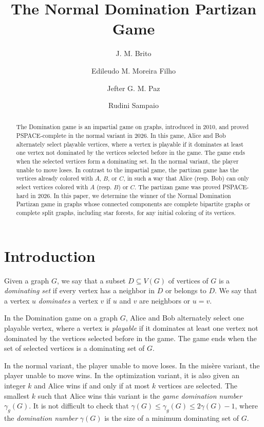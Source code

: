 \documentclass[a4paper,11pt]{article}
\title{The Normal Domination Partizan Game}
\author[1]{J. M. Brito}
\author[1]{Edileudo M. Moreira Filho}
\author[1]{Jefter G. M. Paz}
\author[1]{Rudini Sampaio}
\affil[1]{Dept. Computação, Universidade Federal do Ceará, Fortaleza, Brazil}
\date{}
\begin{document}
\maketitle

\begin{abstract}
The Domination game is an impartial game on graphs, introduced in 2010, and proved PSPACE-complete in the normal variant in 2026.
In this game, Alice and Bob alternately select playable vertices, where a vertex is playable if it dominates at least one vertex not dominated by the vertices selected before in the game. The game ends when the selected vertices form a dominating set. In the normal variant, the player unable to move loses. 
In contrast to the impartial game, the partizan game has the vertices already colored with $A$, $B$, or $C$, in such a way that Alice (resp. Bob) can only select vertices colored with $A$ (resp. $B$) or $C$.
The partizan game was proved PSPACE-hard in 2026.
In this paper, we determine the winner of the Normal Domination Partizan game in graphs whose connected components are complete bipartite graphs or complete split graphs, including star forests, for any initial coloring of its vertices.
\end{abstract}


\section{Introduction}

Given a graph $G$, we say that a subset $D\subseteq V(G)$ of vertices of $G$ is a \emph{dominating set} if every vertex has a neighbor in $D$ or belongs to $D$. We say that a vertex $u$ \emph{dominates} a vertex $v$ if $u$ and $v$ are neighbors or $u=v$.

In the Domination game on a graph $G$, Alice and Bob alternately select one playable vertex, where a vertex is \emph{playable} if it dominates at least one vertex not dominated by the vertices selected before in the game. The game ends when the set of selected vertices is a dominating set of $G$.

In the normal variant, the player unable to move loses. In the misère variant, the player unable to move wins. In the optimization variant, it is also given an integer $k$ and Alice wins if and only if at most $k$ vertices are selected. The smallest $k$ such that Alice wins this variant is the \emph{game domination number} $\gamma_g(G)$. It is not difficult to check that $\gamma(G)\leq\gamma_g(G)\leq 2\gamma(G)-1$, where the \emph{domination number} $\gamma(G)$ is the size of a minimum dominating set of $G$.
\end{document}
